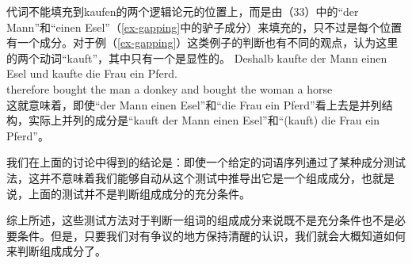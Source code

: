 \eal
{}
\zl
代词不能填充到kaufen的两个逻辑论元的位置上，而是由（33）中的“der Mann”和“einen Esel”（\ref{ex-gapping}中的驴子成分）来填充的，只不过是每个位置有一个成分。对于例（\ref{ex-gapping}）这类例子的判断也有不同的观点，\citep{Crysmann2003c}认为这里的两个动词“kauft”，其中只有一个是显性的。
\ea
\gll Deshalb kaufte der Mann einen Esel und kaufte die Frau ein Pferd.\\
	 therefore bought the man a donkey and bought the woman a horse\\
\z
这就意味着，即使“der Mann einen Esel”和“die Frau ein Pferd”看上去是并列结构，实际上并列的成分是“kauft der Mann einen Esel”和“(kauft) die Frau ein Pferd”。

我们在上面的讨论中得到的结论是：即使一个给定的词语序列通过了某种成分测试法，这并不意味着我们能够自动从这个测试中推导出它是一个组成成分，也就是说，上面的测试并不是判断组成成分的充分条件。

综上所述，这些测试方法对于判断一组词的组成成分来说既不是充分条件也不是必要条件。但是，只要我们对有争议的地方保持清醒的认识，我们就会大概知道如何来判断组成成分了。

